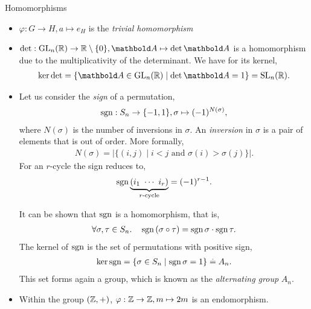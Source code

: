\begin{ex}{Homomorphisms}{}
\begin{itemize}
    \item ${\varphi : G \to H, a \mapsto e_H}$ is the \emph{trivial homomorphism}
    
    \item ${\det : \GL{n}{\R} \to \woZ{\R}, \mA \mapsto \det{\mA}}$ is a homomorphism due to the multiplicativity of the determinant. We have for its kernel, \begin{align}
        \ker{\det} = \{\mA \in \GL{n}{\R} \mid \det{\mA} = 1\} = \SL{n}{\R}. \label{eq:det_kernel}
    \end{align}
    
    \item Let us consider the \emph{sign} of a permutation, \begin{align}
        \operatorname*{sgn} : S_n \to \{-1, 1\}, \sigma \mapsto (-1)^{N(\sigma)},
    \end{align} where $N(\sigma)$ is the number of inversions in $\sigma$. An \emph{inversion} in $\sigma$ is a pair of elements that is out of order. More formally, \begin{align}
        N(\sigma) = |\{(i,j) \mid \text{$i < j$ and $\sigma(i) > \sigma(j)$}\}|.
    \end{align} For an $r$-cycle the sign reduces to, \begin{align}
        \operatorname*{sgn}{\underbrace{(i_1\ \cdots\ i_r)}_{\text{$r$-cycle}}} = (-1)^{r-1}.
    \end{align}
    
    It can be shown that $\operatorname*{sgn}$ is a homomorphism, that is, \begin{align}
        \forall \sigma, \tau \in S_n.\quad \operatorname*{sgn}{(\sigma \circ \tau)} = \operatorname*{sgn}{\sigma} \cdot \operatorname*{sgn}{\tau}.
    \end{align} The kernel of $\operatorname*{sgn}$ is the set of permutations with positive sign, \begin{align}
        \ker{\operatorname*{sgn}} = \{\sigma \in S_n \mid \operatorname*{sgn}{\sigma} = 1\} \overset{.}{=} A_n. \label{eq:alternating_group}
    \end{align} This set forms again a group, which is known as the \emph{alternating group} $A_n$.
    
    \item Within the group $(\mathbb{Z},+)$, $\varphi : \mathbb{Z} \to \mathbb{Z}, m \mapsto 2 m$ is an endomorphism.
\end{itemize}
\end{ex}

